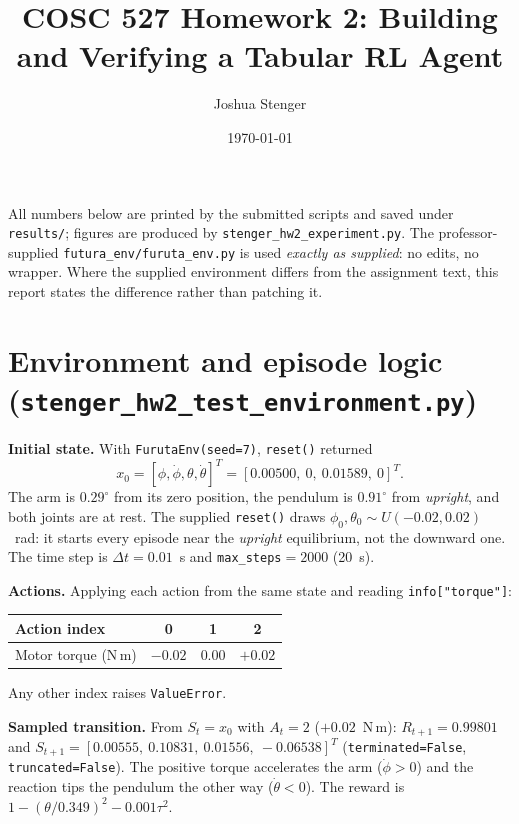 \documentclass[11pt]{article}
\title{COSC 527 Homework 2: Building and Verifying a Tabular RL Agent}
\author{Joshua Stenger}
\date{\today}
\begin{document}
\maketitle

\noindent All numbers below are printed by the submitted scripts and saved under
\texttt{results/}; figures are produced by \texttt{stenger\_hw2\_experiment.py}.
The professor-supplied \texttt{futura\_env/furuta\_env.py} is used \emph{exactly as
supplied}: no edits, no wrapper. Where the supplied environment differs from the
assignment text, this report states the difference rather than patching it.

\section{Environment and episode logic (\texttt{stenger\_hw2\_test\_environment.py})}

\textbf{Initial state.} With \texttt{FurutaEnv(seed=7)}, \texttt{reset()} returned
\[
x_0=[\phi,\dot\phi,\theta,\dot\theta]^T=[0.00500,\ 0,\ 0.01589,\ 0]^T .
\]
The arm is $0.29^\circ$ from its zero position, the pendulum is $0.91^\circ$ from
\emph{upright}, and both joints are at rest. The supplied \texttt{reset()} draws
$\phi_0,\theta_0\sim U(-0.02,0.02)$~rad: it starts every episode near the
\emph{upright} equilibrium, not the downward one. The time step is
$\Delta t=0.01$~s and \texttt{max\_steps}$=2000$ (20~s).

\textbf{Actions.} Applying each action from the same state and reading
\texttt{info["torque"]}:
\begin{center}
\begin{tabular}{lccc}\toprule
Action index & 0 & 1 & 2\\\midrule
Motor torque (N\,m) & $-0.02$ & $0.00$ & $+0.02$\\\bottomrule
\end{tabular}
\end{center}
Any other index raises \texttt{ValueError}.

\textbf{Sampled transition.} From $S_t=x_0$ with $A_t=2$ ($+0.02$~N\,m):
$R_{t+1}=0.99801$ and
$S_{t+1}=[0.00555,\ 0.10831,\ 0.01556,\ -0.06538]^T$
(\texttt{terminated=False}, \texttt{truncated=False}). The positive torque
accelerates the arm ($\dot\phi>0$) and the reaction tips the pendulum the
other way ($\dot\theta<0$). The reward is $1-(\theta/0.349)^2-0.001\tau^2$.
\end{document}

